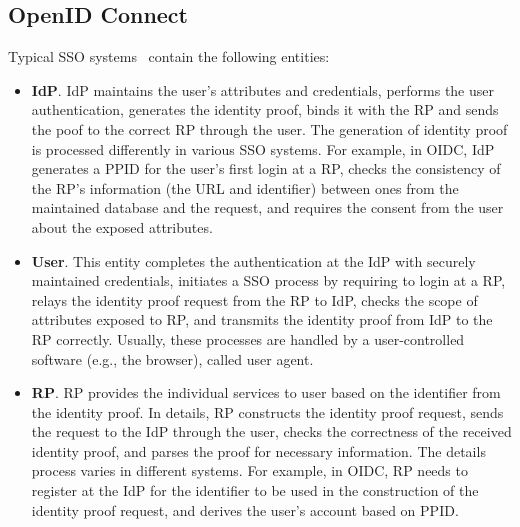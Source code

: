 \subsection{OpenID Connect}
\label{subsec:OIDC}
Typical SSO systems~\cite{SAMLIdentifier,OpenIDConnect,SPRESSO} contain the following entities:
\begin{itemize}
    \item \textbf{IdP}. IdP maintains the user's attributes and credentials, performs the user authentication, generates the identity proof, binds it with the RP and sends the poof  to the correct RP through the user. The generation of identity proof is processed differently in various SSO systems. For example, in OIDC, IdP generates a PPID for the user's first login at a RP, checks the consistency of the RP's information (the URL and identifier) between ones from the maintained database and the request, and requires the  consent from the user about the exposed attributes.
     \item \textbf{User}. This entity completes the authentication at the IdP with securely maintained credentials, initiates a SSO process by requiring to login at a RP, relays the identity proof request from the RP to IdP, checks the scope of attributes exposed to RP, and transmits the identity proof from IdP to the RP correctly. Usually, these processes are handled by  a user-controlled software (e.g., the browser), called user agent.
    \item \textbf{RP}. RP provides the individual services to user based on the identifier from the identity proof. In details, RP constructs the identity proof request, sends the request to the IdP through the user, checks the correctness of the received identity proof, and parses the proof for necessary information. The details process varies in different systems. For example, in OIDC, RP needs to register at the IdP for the identifier to be used in the construction of the identity proof request, and derives the user's account based on PPID.
\end{itemize}
